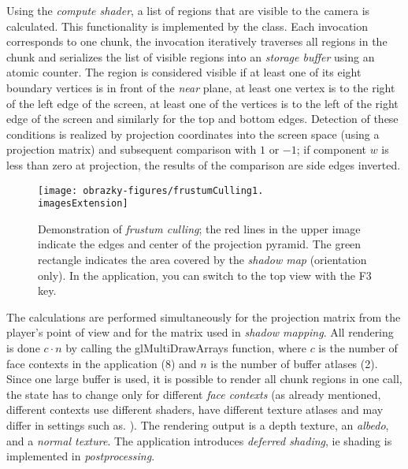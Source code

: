 Using the \textit{compute shader}, a list of regions that are visible to the camera is calculated.
This functionality is implemented by the  class. Each invocation corresponds to one chunk,
the invocation iteratively traverses all regions in the chunk and serializes the list of visible regions into an \textit{storage buffer} using an atomic counter. The region is considered visible if
at least one of its eight boundary vertices is in front of the \textit{near} plane, at least one vertex is
to the right of the left edge of the screen, at least one of the vertices is to the left of the right edge of the screen and similarly for the top and bottom edges. Detection of these conditions is realized by projection
coordinates into the screen space (using a projection matrix) and subsequent comparison with
$1$ or $−1$; if component $w$ is less than zero at projection, the results of the comparison are
side edges inverted.

\begin{figure}[H]
	\centering
	\begin{minipage}{\textwidth}
		\centering
		\texttt{[image: obrazky-figures/frustumCulling1.\\imagesExtension]}
	\end{minipage}
	\vspace{2mm}
	
	\caption{Demonstration of \textit{frustum culling}; the red lines in the upper image indicate the edges and center of the projection pyramid. The green rectangle indicates the area covered by the \textit{shadow map} (orientation only). In the application, you can switch to the top view with the F3 key.}
\end{figure}

The calculations are performed simultaneously for the projection matrix from the player's point of view and for the matrix used in \textit{shadow mapping}. All rendering is done $c \cdot n$ by calling the glMultiDrawArrays function, where $c$ is the number of face contexts in the application (8) and $n$ is the number of buffer atlases (2). Since one large buffer is used, it is possible to render all chunk regions in one call, the state has to change only for different \textit{face contexts} (as already mentioned, different contexts use different shaders, have different texture atlases and may differ in settings such as. ). The rendering output is a depth texture, an \textit{albedo}, and a \textit{normal texture}. The application introduces \textit{deferred shading}, ie shading is implemented in \textit{postprocessing}.

